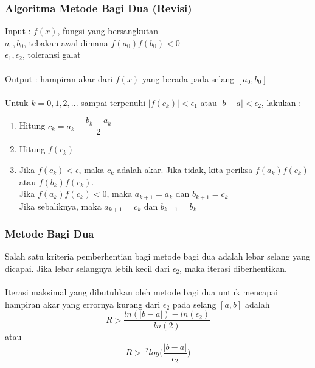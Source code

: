 \documentclass{beamer}
\begin{document}

\begin{frame}
\frametitle{Algoritma Metode Bagi Dua (Revisi)}
Input : $f(x)$, fungsi yang bersangkutan
\\\quad \qquad $a_0,b_0$, tebakan awal dimana $f(a_0)f(b_0)<0$
\\\quad \qquad $\epsilon_1, \epsilon_2$, toleransi galat
\\\ \\Output : hampiran akar dari $f(x)$ yang berada pada selang $[a_0,b_0]$
\\\ \\Untuk $k=0,1,2, ...$ sampai terpenuhi $|f(c_k)|<\epsilon_1$ atau $|b-a|<\epsilon_2$, lakukan :
\begin{enumerate}
\item Hitung $c_k = a_k + \dfrac{b_k-a_k}{2}$
\item Hitung $f(c_k)$
\item Jika $f(c_k)<\epsilon$, maka $c_k$ adalah akar. Jika tidak, kita periksa $f(a_k)f(c_k)$ atau $f(b_k)f(c_k)$. \\\qquad Jika $f(a_k)f(c_k)<0$, maka $a_{k+1}=a_k$ dan $b_{k+1}=c_k$
\\\qquad Jika sebaliknya, maka $a_{k+1}=c_k$ dan $b_{k+1}=b_k$
\end{enumerate} 
\end{frame}


\begin{frame}
\frametitle{Metode Bagi Dua}
Salah satu kriteria pemberhentian bagi metode bagi dua adalah lebar selang yang dicapai. Jika lebar selangnya lebih kecil dari $\epsilon_2$, maka iterasi diberhentikan.
\\\ \\
Iterasi maksimal yang dibutuhkan oleh metode bagi dua untuk mencapai hampiran akar yang errornya kurang dari $\epsilon_2$ pada selang $[a,b]$ adalah
\begin{equation}
R > \dfrac{ln(|b-a|)-ln(\epsilon_2)}{ln(2)}
\nonumber
\end{equation}
atau 
\begin{equation}
R >\ ^2log\biggl(\dfrac{|b-a|}{\epsilon_2}\biggr)
\nonumber
\end{equation}
\end{frame}

\end{document}

